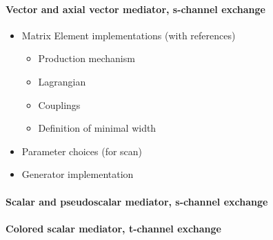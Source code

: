 \paragraph{Vector and axial vector mediator, s-channel exchange}

\begin{itemize}
\item Matrix Element implementations (with references)
\begin{itemize}
 \item Production mechanism
 \item Lagrangian
 \item Couplings
 \item Definition of minimal width
\end{itemize}
\item Parameter choices (for scan)
\item Generator implementation
\end{itemize}

\paragraph{Scalar and pseudoscalar mediator, s-channel exchange}

\paragraph{Colored scalar mediator, t-channel exchange}
